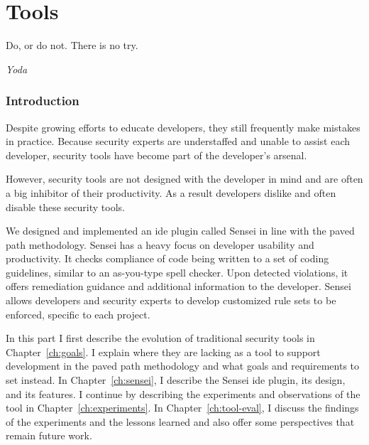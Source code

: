 \part{Tools}
\label{p:tools}
\epigraph{Do, or do not. There is no try.}{\textit{Yoda}}

\clearpage
\section*{Introduction}

Despite growing efforts to educate developers, they still frequently make mistakes in practice.
Because security experts are understaffed and unable to assist each developer, security tools have become part of the developer's arsenal.

However, security tools are not designed with the developer in mind and are often a big inhibitor of their productivity. As a result developers dislike and often disable these security tools. 


We designed and implemented an \gls{ide} plugin called Sensei in line with the paved path methodology.
Sensei has a heavy focus on developer usability and productivity.
It checks compliance of code being written to a set of coding guidelines, similar to an as-you-type spell checker.
Upon detected violations, it offers remediation guidance and additional information to the developer.
Sensei allows developers and security experts to develop customized rule sets to be enforced, specific to each project.

In this part I first describe the evolution of traditional security tools in Chapter~\ref{ch:goals}.
I explain where they are lacking as a tool to support development in the paved path methodology and what goals and requirements to set instead.
In Chapter~\ref{ch:sensei}, I describe the Sensei \gls{ide} plugin, its design, and its features.
I continue by describing the experiments and observations of the tool in Chapter~\ref{ch:experiments}.
In Chapter~\ref{ch:tool-eval}, I discuss the findings of the experiments and the lessons learned and also offer some perspectives that remain future work.

%
%

